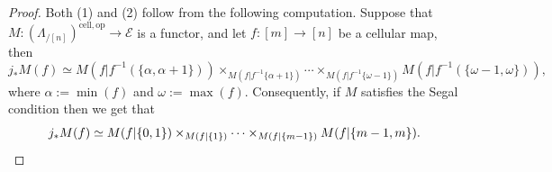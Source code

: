 \documentclass[10pt,a4paper]{amsart}
\newcommand{\E}{\mathscr{E}}
\newcommand{\op}{\mathrm{op}}
\begin{document}
\begin{proof}
	Both (1) and (2) follow from the following computation. Suppose that 
	 $M : (\Lambda_{/[n]})^{\mathrm{cell}, \op} \rightarrow \E$ is a functor, and let $f : [m] \rightarrow [n]$ be a cellular map, then 
	$$
	j_*M(f) \simeq M(f|f^{-1}(\{\alpha, \alpha+1\})) \times_{M(f|f^{-1}\{\alpha+1\})} \dotsb \times_{M(f|f^{-1}\{\omega-1\})} M(f|f^{-1}(\{\omega-1,\omega\})),
	$$
	where $\alpha := \min(f)$ and $\omega := \max(f)$. 
	Consequently, if $M$ satisfies the Segal condition then we get that
	\begin{displaymath}
	j_*M(f) \simeq M(f|\{0,1\}) \times_{M(f|\{1\})} \dotsb \times_{M(f|\{m-1\})} M(f|\{m-1,m\}). \qedhere
	\end{displaymath}
\end{proof}
\end{document}
